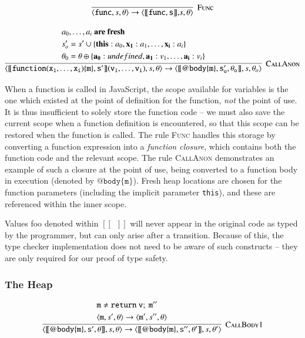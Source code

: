 \documentclass[12pt,a4paper,twoside,openright]{report}
\theoremstyle{definition}
\theoremstyle{dotless}
\newcommand*{\js}{\texttt}
\begin{document}
$$\infer[\textsc{Func}]
{\langle \mathtt{func}, s, \theta\rangle \rightarrow
  \langle\mathtt{[\![func, s]\!],} s, \theta\rangle}{}$$

$$\infer[\textsc{CallAnon}]
{\langle\mathtt{[\![function(x_1, \dots, x_i)\{m\},s']\!](v_1, \dots, v_i)}, s, \theta\rangle\rightarrow
  \langle\mathtt{[\![@body\{m\},s_o',\theta_o]\!]},s, \theta_o\rangle
}{
  \begin{split}
	&a_0, \dots, a_i\textbf{ are fresh} \\
	&s_o' = s' \cup \{\mathbf{this}: a_0, \mathbf{x_1}:a_1, \dots, \mathbf{x_i}: a_i\} \\
	&\theta_0 = \theta \oplus\{\mathbf{a_0}: undefined, \mathbf{a_1}:v_1, \dots, \mathbf{a_i}: v_i\}
  \end{split}
}$$

When a function is called in JavaScript, the scope available for variables is
the one which existed at the point of definition for the function, \textit{not}
the point of use. It is thus insufficient to solely store the function code --
we must also save the current scope when a function definition is encountered,
so that this scope can be restored when the function is called. The rule
\textsc{Func} handles this storage by converting a function expression into a
\textit{function closure}, which contains both the function code and the
relevant scope. The rule \textsc{CallAnon} demonstrates an example of such a
closure at the point of use, being converted to a function body in execution
(denoted by $\mathtt{@body\{m\}}$). Fresh heap locations are chosen for the 
function parameters (including the implicit parameter \js{this}), and these
are referenced within the inner scope.

Values foo denoted within $[\![\enspace]\!]$ will never appear in
the original code as typed by the programmer, but can only arise after a
transition. Because of this, the type checker implementation does not need to
be aware of such constructs -- they are only required for our proof of type
safety.


\subsubsection*{The Heap}

$$\infer[\textsc{CallBody1}]
{\langle \mathtt{[\![@body\{m\}, s', \theta]\!]}, s, \theta\rangle  \rightarrow
  \langle \mathtt{[\![@body\{m\}, s'', \theta']\!]}, s, \theta'\rangle }
{ \begin{split}
  	& \mathtt{m} \not = \mathtt{return\ v;\ m''} \\
  	& \langle\mathtt{m}, s', \theta\rangle\rightarrow\langle \mathtt{m'},s'', \theta\rangle
  \end{split}
}$$
\end{document}
